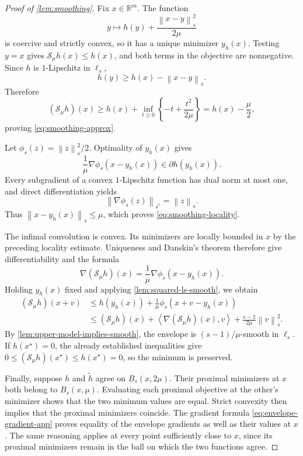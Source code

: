 \documentclass[11pt]{article}
\newcommand{\R}{\mathbb{R}}
\newcommand{\cS}{\mathcal{S}}
\newcommand{\ip}[2]{\left\langle #1,#2\right\rangle}
\newcommand{\norm}[2]{\left\lVert #1\right\rVert_{#2}}
\theoremstyle{definition}
\theoremstyle{remark}
\begin{document}
\begin{proof}[Proof of \cref{lem:smoothing}]
Fix $x\in\R^m$.  The function
\[
 y\longmapsto h(y)+\frac{\norm{x-y}{s}^2}{2\mu}
\]
is coercive and strictly convex, so it has a unique minimizer $y_h(x)$.
Testing $y=x$ gives $\cS_\mu h(x)\le h(x)$, and both terms in the
objective are nonnegative.  Since $h$ is $1$-Lipschitz in $\ell_s$,
\[
 h(y)\ge h(x)-\norm{x-y}{s}.
\]
Therefore
\[
 (\cS_\mu h)(x)
 \ge h(x)+\inf_{t\ge0}\left\{-t+\frac{t^2}{2\mu}\right\}
 =h(x)-\frac\mu2,
\]
proving \cref{eq:smoothing-approx}.

Let $\phi_s(z)=\norm{z}{s}^2/2$.
Optimality of $y_h(x)$ gives
\begin{equation}
\label{eq:prox-optimality-app}
 \frac1\mu\nabla\phi_s(x-y_h(x))\in\partial h(y_h(x)).
\end{equation}
Every subgradient of a convex $1$-Lipschitz function has dual norm at
most one, and direct differentiation yields
\[
 \norm{\nabla\phi_s(z)}{s^*}=\norm{z}{s}.
\]
Thus $\norm{x-y_h(x)}{s}\le\mu$, which proves
\cref{eq:smoothing-locality}.

The infimal convolution is convex.  Its minimizers are locally bounded
in $x$ by the preceding locality estimate.  Uniqueness and Danskin's
theorem therefore give differentiability and the formula
\begin{equation}
\label{eq:envelope-gradient-app}
 \nabla(\cS_\mu h)(x)
 =\frac1\mu\nabla\phi_s(x-y_h(x)).
\end{equation}
Holding $y_h(x)$ fixed and applying \cref{lem:squared-ls-smooth}, we obtain
\begin{align*}
 (\cS_\mu h)(x+v)
 &\le h(y_h(x))+\frac1\mu\phi_s(x+v-y_h(x))\\
 &\le(\cS_\mu h)(x)
       +\ip{\nabla(\cS_\mu h)(x)}{v}
       +\frac{s-1}{2\mu}\norm{v}{s}^2.
\end{align*}
By \cref{lem:upper-model-implies-smooth}, the envelope is
$(s-1)/\mu$-smooth in $\ell_s$.
If $h(x^\star)=0$, the already established inequalities give
$0\le(\cS_\mu h)(x^\star)\le h(x^\star)=0$, so the minimum is preserved.

Finally, suppose $h$ and $\widetilde h$ agree on $B_s(x,2\mu)$.
Their proximal minimizers at $x$ both belong to $B_s(x,\mu)$.
Evaluating each proximal objective at the other's minimizer shows that
the two minimum values are equal.  Strict convexity then implies that
the proximal minimizers coincide.  The gradient formula
\cref{eq:envelope-gradient-app} proves equality of the envelope gradients
as well as their values at $x$.
The same reasoning applies at every point sufficiently close to $x$,
since its proximal minimizers remain in the ball on which the two
functions agree.
\end{proof}
\end{document}
